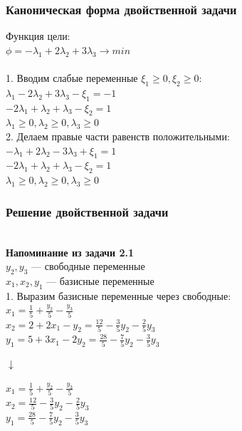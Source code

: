 \documentclass[14pt,a4paper,fleqn]{extarticle}
\begin{document}
\subsubsection*{Каноническая форма двойственной задачи}
Функция цели:\\
$\phi = -\lambda_1 + 2\lambda_2 + 3\lambda_3 \longrightarrow min$\\\\
1. Вводим слабые переменные $\xi_1 \geq 0, \xi_2 \geq 0$:\\
$\lambda_1 - 2\lambda_2 + 3\lambda_3 - \xi_1 = -1$\\
$-2\lambda_1 + \lambda_2 + \lambda_3 - \xi_2 = 1$\\
$\lambda_1 \geq 0, \lambda_2 \geq 0, \lambda_3 \geq 0$\\

2. Делаем правые части равенств положительными:\\
$-\lambda_1 + 2\lambda_2 - 3\lambda_3 + \xi_1 = 1$\\
$-2\lambda_1 + \lambda_2 + \lambda_3 - \xi_2 = 1$\\
$\lambda_1 \geq 0, \lambda_2 \geq 0, \lambda_3 \geq 0$
\newpage
\subsubsection*{Решение двойственной задачи}
\noindent\makebox[\linewidth]{\rule{\paperwidth}{0.4pt}}\\
\textbf{Напоминание из задачи 2.1}\\
$y_2, y_3$ --- свободные переменные\\
$x_1, x_2, y_1$ --- базисные переменные\\

1. Выразим базисные переменные через свободные:\\
$x_1 = \frac{1}{5} + \frac{y_2}{5} - \frac{y_3}{5}$\\
$x_2 = 2 + 2x_1 - y_2 = \frac{12}{5} - \frac{3}{5}y_2 - \frac{2}{5}y_3$\\
$y_1 = 5 + 3x_1 - 2y_2 = \frac{28}{5} - \frac{7}{5}y_2 - \frac{3}{5}y_3$\\
\begin{center}$\downarrow$\end{center}
$x_1 = \frac{1}{5} + \frac{y_2}{5} - \frac{y_3}{5}$\\
$x_2 = \frac{12}{5} - \frac{3}{5}y_2 - \frac{2}{5}y_3$\\
$y_1 = \frac{28}{5} - \frac{7}{5}y_2 - \frac{3}{5}y_3$\\
\end{document}
